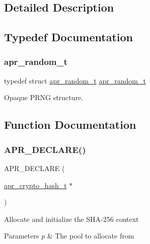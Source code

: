 \subsection{Detailed Description}


\subsection{Typedef Documentation}
\mbox{\label{group__apr__random_ga33073741e56b1bafe52ba58cefcbbf96}} 
\subsubsection{\texorpdfstring{apr\+\_\+random\+\_\+t}{apr\_random\_t}}
{\footnotesize\ttfamily typedef struct \mbox{\hyperlink{group__apr__random_ga33073741e56b1bafe52ba58cefcbbf96}{apr\+\_\+random\+\_\+t}} \mbox{\hyperlink{group__apr__random_ga33073741e56b1bafe52ba58cefcbbf96}{apr\+\_\+random\+\_\+t}}}

Opaque P\+R\+NG structure. 

\subsection{Function Documentation}
\mbox{\label{group__apr__random_ga198e0e695921706b8452432b40a48678}} 
\subsubsection{\texorpdfstring{A\+P\+R\+\_\+\+D\+E\+C\+L\+A\+R\+E()}{APR\_DECLARE()}\hspace{0.1cm}{\footnotesize\ttfamily [1/4]}}
{\footnotesize\ttfamily A\+P\+R\+\_\+\+D\+E\+C\+L\+A\+RE (\begin{DoxyParamCaption}\item[{\mbox{\hyperlink{structapr__crypto__hash__t}{apr\+\_\+crypto\+\_\+hash\+\_\+t}} $\ast$}]{ }\end{DoxyParamCaption})}

Allocate and initialize the S\+H\+A-\/256 context 
\begin{DoxyParams}{Parameters}
{\em p} & The pool to allocate from \\
\hline
\end{DoxyParams}
\mbox{\label{group__apr__random_ga0beeda9af106148755f0dde71aea6c93}} 

